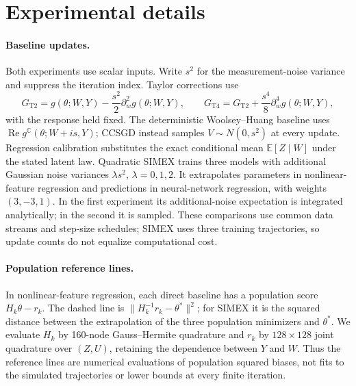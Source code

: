 \section{Experimental details}
\label{app:experiment_details}

\paragraph{Baseline updates.}
Both experiments use scalar inputs. Write $s^2$ for the measurement-noise
variance and suppress the iteration index. Taylor corrections use
\[
G_{\mathrm{T2}}=g(\theta;W,Y)-\frac{s^2}{2}\partial_w^2g(\theta;W,Y),
\qquad
G_{\mathrm{T4}}=G_{\mathrm{T2}}+
\frac{s^4}{8}\partial_w^4g(\theta;W,Y),
\]
with the response held fixed. The deterministic Woolsey--Huang baseline
uses $\operatorname{Re}g^{\mathbb C}(\theta;W+is,Y)$; CCSGD instead
samples $V\sim N(0,s^2)$ at every update. Regression calibration substitutes
the exact conditional mean $\mathbb E[Z\mid W]$ under the stated latent law.
Quadratic SIMEX trains three models with additional Gaussian noise
variances $\lambda s^2$, $\lambda=0,1,2$. It extrapolates parameters in
nonlinear-feature regression and predictions in neural-network regression,
with weights $(3,-3,1)$. In the first experiment its additional-noise
expectation is integrated analytically; in the second it is sampled.
These comparisons use common data streams and step-size schedules;
SIMEX uses three training trajectories, so update counts do not equalize
computational cost.

\paragraph{Population reference lines.}
In nonlinear-feature regression, each direct baseline has a population
score $H_k\theta-r_k$. The dashed line is
$\|H_k^{-1}r_k-\theta^*\|^2$; for SIMEX it is the squared distance between
the extrapolation of the three population minimizers and $\theta^*$.
We evaluate $H_k$ by 160-node Gauss--Hermite quadrature and $r_k$ by
$128\times128$ joint quadrature over $(Z,U)$, retaining the dependence
between $Y$ and $W$. Thus the reference lines are numerical evaluations
of population squared biases, not fits to the simulated trajectories or
lower bounds at every finite iteration.

